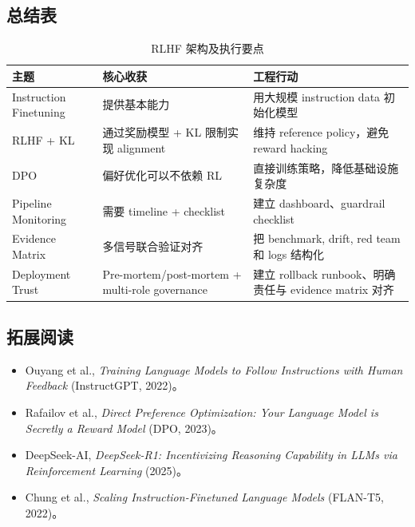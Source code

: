 \documentclass[a4paper]{article}
\begin{document}
\subsection{总结表}

\begin{table}[H]
\centering
\begin{tabular}{p{} p{} p{}}
\toprule
主题 & 核心收获 & 工程行动 \\
\midrule
Instruction Finetuning & 提供基本能力 & 用大规模 instruction data 初始化模型 \\
RLHF + KL & 通过奖励模型 + KL 限制实现 alignment & 维持 reference policy，避免 reward hacking \\
DPO & 偏好优化可以不依赖 RL & 直接训练策略，降低基础设施复杂度 \\
Pipeline Monitoring & 需要 timeline + checklist & 建立 dashboard、guardrail checklist \\
Evidence Matrix & 多信号联合验证对齐 & 把 benchmark, drift, red team 和 logs 结构化 \\
Deployment Trust & Pre-mortem/post-mortem + multi-role governance & 建立 rollback runbook、明确责任与 evidence matrix 对齐 \\
\bottomrule
\end{tabular}
\caption{RLHF 架构及执行要点}
\end{table}

\subsection{拓展阅读}
\begin{itemize}
    \item Ouyang et al., \textit{Training Language Models to Follow Instructions with Human Feedback} (InstructGPT, 2022)。
    \item Rafailov et al., \textit{Direct Preference Optimization: Your Language Model is Secretly a Reward Model} (DPO, 2023)。
    \item DeepSeek-AI, \textit{DeepSeek-R1: Incentivizing Reasoning Capability in LLMs via Reinforcement Learning} (2025)。
    \item Chung et al., \textit{Scaling Instruction-Finetuned Language Models} (FLAN-T5, 2022)。
\end{itemize}
\end{document}
